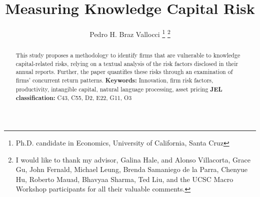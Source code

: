 \documentclass[12pt, letterpaper]{article}
\begin{document}
\title{Measuring Knowledge Capital Risk} %
\author{Pedro H. Braz Vallocci \footnote{Ph.D. candidate in Economics, University of California, Santa Cruz} 
\footnote{I would like to thank my advisor, Galina Hale, and Alonso Villacorta, Grace Gu, John Fernald, Michael Leung, Brenda Samaniego de la Parra, Chenyue Hu, Roberto Mauad, Bhavyaa Sharma, Ted Liu, and the UCSC Macro Workshop participants for all their valuable comments.}} %

\newcommand{\ffo}{dicfullmc10thr10defnob5noa0_8_4t}

\newcommand{\insertfigure}[3]{
\begin{figure}[H]
  \centering
  \texttt{[image: \\ffo/\#1]}
  \caption{#2}
  \label{fig:#1}
\end{figure}
}


\newcommand{\tkk}{$Topic_{kk}$ }

\maketitle 

\begin{abstract}
    This study proposes a methodology to identify firms that are vulnerable to knowledge capital-related risks, relying on a textual analysis of the risk factors disclosed in their annual reports. Further, the paper quantifies these risks through an examination of firms' concurrent return patterns. \newline \textbf{\indent Keywords:} Innovation, firm risk factors, productivity, intangible capital, natural language processing, asset pricing \newline \textbf{\indent JEL classification:} C43, C55, D2, E22, G11, O3
\end{abstract}

\newpage 
\end{document}
